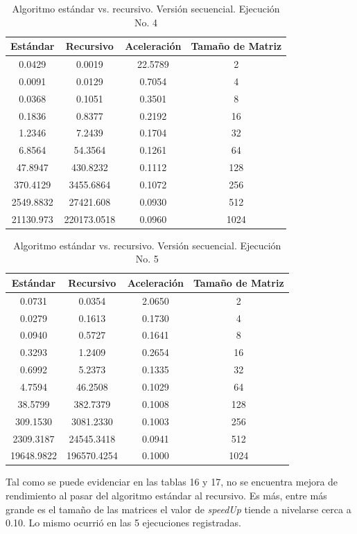 \documentclass{article}
\begin{document}
\begin{table}[ht]
\centering
\begin{tabular}{|c|c|c|c|}
\hline
\textbf{Estándar} & \textbf{Recursivo} & \textbf{Aceleración} & \textbf{Tamaño de Matriz} \\
\hline
0.0429 & 0.0019 & 22.5789 & 2 \\
0.0091 & 0.0129 & 0.7054 & 4 \\
0.0368 & 0.1051 & 0.3501 & 8 \\
0.1836 & 0.8377 & 0.2192 & 16 \\
1.2346 & 7.2439 & 0.1704 & 32 \\
6.8564 & 54.3564 & 0.1261 & 64 \\
47.8947 & 430.8232 & 0.1112 & 128 \\
370.4129 & 3455.6864 & 0.1072 & 256 \\
2549.8832 & 27421.608 & 0.0930 & 512 \\
21130.973 & 220173.0518 & 0.0960 & 1024 \\
\hline
\end{tabular}
\caption{Algoritmo estándar vs. recursivo. Versión secuencial. Ejecución No. 4}
\end{table}

\begin{table}[ht]
\centering
\begin{tabular}{|c|c|c|c|}
\hline
\textbf{Estándar} & \textbf{Recursivo} & \textbf{Aceleración} & \textbf{Tamaño de Matriz} \\
\hline
0.0731 & 0.0354 & 2.0650 & 2 \\
0.0279 & 0.1613 & 0.1730 & 4 \\
0.0940 & 0.5727 & 0.1641 & 8 \\
0.3293 & 1.2409 & 0.2654 & 16 \\
0.6992 & 5.2373 & 0.1335 & 32 \\
4.7594 & 46.2508 & 0.1029 & 64 \\
38.5799 & 382.7379 & 0.1008 & 128 \\
309.1530 & 3081.2330 & 0.1003 & 256 \\
2309.3187 & 24545.3418 & 0.0941 & 512 \\
19648.9822 & 196570.4254 & 0.1000 & 1024 \\
\hline
\end{tabular}
\caption{Algoritmo estándar vs. recursivo. Versión secuencial. Ejecución No. 5}
\end{table}

\clearpage

Tal como se puede evidenciar en las tablas 16 y 17, no se encuentra mejora de rendimiento al pasar del algoritmo estándar al recursivo. Es más, entre más grande es el tamaño de las matrices el valor de \textit{speedUp} tiende a nivelarse cerca a 0.10. Lo mismo ocurrió en las 5 ejecuciones registradas.\\
\end{document}
